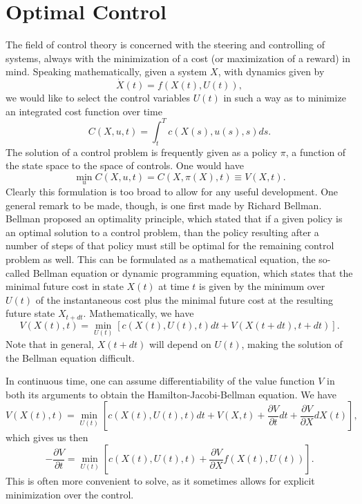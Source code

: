 \section{Optimal Control}
The field of control theory is concerned with the steering and controlling of systems, always with the minimization of a cost (or maximization of a reward) in mind. Speaking mathematically, given a system $X$, with dynamics given by
$$
\dot{X}(t) = f(X(t),U(t)),
$$
we would like to select the control variables $U(t)$ in such a way as to minimize an integrated cost function over time
$$
C(X,u,t) = \int_{t}^T c(X(s),u(s),s) ds.
$$
The solution of a control problem is frequently given as a policy $\pi$, a function of the state space to the space of controls. One would have
$$
\min_u C(X,u,t) = C(X,\pi(X),t) \equiv V(X,t).
$$
Clearly this formulation is too broad to allow for any useful development. One general remark to be made, though, is one first made by Richard Bellman. Bellman\cite{Bellman1952} proposed an optimality principle, which stated that if a given policy is an optimal solution to a control problem, than the policy resulting after a number of steps of that policy must still be optimal for the remaining control problem as well. This can be formulated as a mathematical equation, the so-called Bellman equation or dynamic programming equation, which states that the minimal future cost in state $X(t)$ at time $t$ is given by the minimum over $U(t)$ of the instantaneous cost plus the minimal future cost at the resulting future state $X_{t+dt}$. Mathematically, we have
$$
V(X(t),t) = \min_{U(t)} \left[ c(X(t),U(t),t) dt +V(X({t+dt}),t+dt)\right].
$$
Note that in general, $X({t+dt})$ will depend on $U(t)$, making the solution of the Bellman equation difficult.\par
In continuous time, one can assume differentiability of the value function $V$ in both its arguments to obtain the Hamilton-Jacobi-Bellman equation. We have
$$
V(X(t),t) = \min_{U(t)} \left[c(X(t),U(t),t) dt + V(X,t) + \frac{\partial V}{\partial t} dt + \frac{\partial V}{\partial X} dX(t) \right],
$$
which gives us then
$$
-\frac{\partial V}{\partial t} = \min_{U(t)} \left[c(X(t),U(t),t) + \frac{\partial V}{\partial X} f(X(t),U(t)) \right].
$$
This is often more convenient to solve, as it sometimes allows for explicit minimization over the control.

